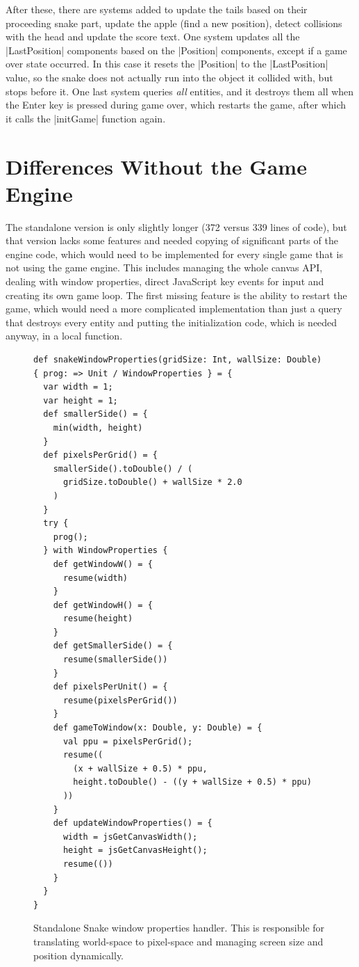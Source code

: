 After these, there are systems added to update the tails based on their proceeding snake part, update the apple (find a new position), detect collisions with the head and update the score text. One system updates all the |LastPosition| components based on the |Position| components, except if a game over state occurred. In this case it resets the |Position| to the |LastPosition| value, so the snake does not actually run into the object it collided with, but stops before it. One last system queries \textit{all} entities, and it destroys them all when the Enter key is pressed during game over, which restarts the game, after which it calls the |initGame| function again.

\section{Differences Without the Game Engine}

The standalone version is only slightly longer (372 versus 339 lines of code), but that version lacks some features and needed copying of significant parts of the engine code, which would need to be implemented for every single game that is not using the game engine. This includes managing the whole canvas API, dealing with window properties, direct JavaScript key events for input and creating its own game loop. The first missing feature is the ability to restart the game, which would need a more complicated implementation than just a query that destroys every entity and putting the initialization code, which is needed anyway, in a local function.

\begin{figure}[h!]
\begin{lstlisting}
def snakeWindowProperties(gridSize: Int, wallSize: Double)
{ prog: => Unit / WindowProperties } = {
  var width = 1;
  var height = 1;
  def smallerSide() = {
    min(width, height)
  }
  def pixelsPerGrid() = {
    smallerSide().toDouble() / (
      gridSize.toDouble() + wallSize * 2.0
    )
  }
  try {
    prog();
  } with WindowProperties {
    def getWindowW() = {
      resume(width)
    }
    def getWindowH() = {
      resume(height)
    }
    def getSmallerSide() = {
      resume(smallerSide())
    }
    def pixelsPerUnit() = {
      resume(pixelsPerGrid())
    }
    def gameToWindow(x: Double, y: Double) = {
      val ppu = pixelsPerGrid();
      resume((
        (x + wallSize + 0.5) * ppu,
        height.toDouble() - ((y + wallSize + 0.5) * ppu)
      ))
    }
    def updateWindowProperties() = {
      width = jsGetCanvasWidth();
      height = jsGetCanvasHeight();
      resume(())
    }
  }
}
\end{lstlisting}
\caption{Standalone Snake window properties handler. This is responsible for translating world-space to pixel-space and managing screen size and position dynamically.}
\label{fig:casestandalonewindow}
\end{figure}

